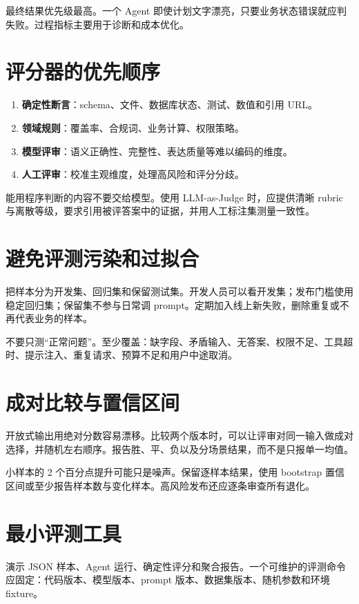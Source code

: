 最终结果优先级最高。一个 Agent 即使计划文字漂亮，只要业务状态错误就应判失败。过程指标主要用于诊断和成本优化。

\section{评分器的优先顺序}

\begin{enumerate}
  \item \textbf{确定性断言}：schema、文件、数据库状态、测试、数值和引用 URL。
  \item \textbf{领域规则}：覆盖率、合规词、业务计算、权限策略。
  \item \textbf{模型评审}：语义正确性、完整性、表达质量等难以编码的维度。
  \item \textbf{人工评审}：校准主观维度，处理高风险和评分分歧。
\end{enumerate}

能用程序判断的内容不要交给模型。使用 LLM-as-Judge 时，应提供清晰 rubric 与离散等级，要求引用被评答案中的证据，并用人工标注集测量一致性。

\section{避免评测污染和过拟合}

把样本分为开发集、回归集和保留测试集。开发人员可以看开发集；发布门槛使用稳定回归集；保留集不参与日常调 prompt。定期加入线上新失败，删除重复或不再代表业务的样本。

不要只测“正常问题”。至少覆盖：缺字段、矛盾输入、无答案、权限不足、工具超时、提示注入、重复请求、预算不足和用户中途取消。

\section{成对比较与置信区间}

开放式输出用绝对分数容易漂移。比较两个版本时，可以让评审对同一输入做成对选择，并随机左右顺序。报告胜、平、负以及分场景结果，而不是只报单一均值。

小样本的 2 个百分点提升可能只是噪声。保留逐样本结果，使用 bootstrap 置信区间或至少报告样本数与变化样本。高风险发布还应逐条审查所有退化。

\section{最小评测工具}

 演示 JSON 样本、Agent 运行、确定性评分和聚合报告。一个可维护的评测命令应固定：代码版本、模型版本、prompt 版本、数据集版本、随机参数和环境 fixture。

